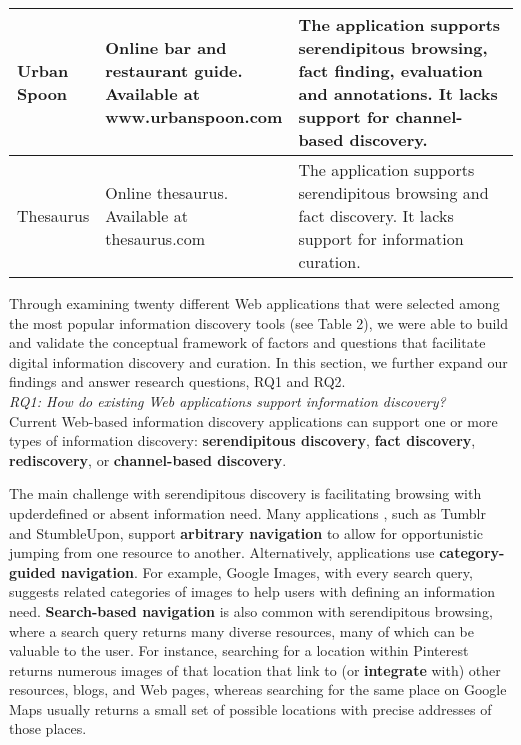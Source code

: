 \documentclass{casconpaper}
\begin{document}
{\begin{table*}[htbp]
\begin{tabular}{|p{0.11\linewidth}| p{0.22\linewidth}| p{0.67\linewidth}|}
\hline
Urban Spoon     & \raggedright Online bar and restaurant guide. Available at www.urbanspoon.com             & The application supports serendipitous browsing, fact finding, evaluation and annotations. It lacks support for channel-based discovery.  \\
\hline
Thesaurus       & \raggedright Online thesaurus. Available at thesaurus.com                                 & The application supports serendipitous browsing and fact discovery. It lacks support for information curation.                                                                                \\
\hline
\end{tabular}
\end{table*}

Through examining twenty different Web applications that were selected among the most popular information discovery tools (see Table 2), we were able to build and validate the conceptual framework of factors and questions that facilitate digital information discovery and curation. In this section, we further expand our findings and answer research questions, RQ1 and RQ2. \\

\emph{RQ1: How do existing Web applications support information discovery?} \\

Current Web-based information discovery applications can support one or more types of information discovery: \textbf{serendipitous discovery}, \textbf{fact discovery}, \textbf{rediscovery}, or \textbf{channel-based discovery}.

The main challenge with serendipitous discovery is facilitating browsing with upderdefined or absent information need. Many applications , such as Tumblr and StumbleUpon, support \textbf{arbitrary navigation} to allow for opportunistic jumping from one resource to another.  Alternatively, applications use \textbf{category-guided navigation}. For example, Google Images, with every search query, suggests related categories of images to help users with defining an information need. \textbf{Search-based navigation} is also common with serendipitous browsing, where a search query returns many diverse resources, many of which can be valuable to the user. For instance, searching for a location within Pinterest returns numerous images of that location that link to (or \textbf{integrate} with) other resources, blogs, and Web pages, whereas searching for the same place on Google Maps usually returns a small set of possible locations with precise addresses of those places. 

}
\end{document}
